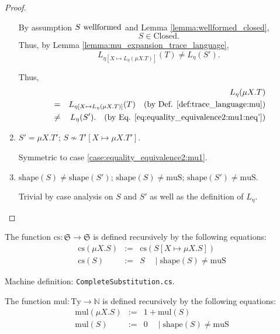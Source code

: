 \documentclass{llncs}
\newcommand*{\Nat}{\mathbb{N}}
\newcommand*{\Ty}{\mathrm{Ty}}
\renewcommand*{\S}{\mathfrak{S}}
\newcommand*{\cs}{\mathrm{cs}}
\newcommand*{\mul}{\mathrm{mul}}
\newcommand*{\shape}{\mathrm{shape}}
\newcommand*{\muS}{\mathrm{muS}}
\newcommand*{\Closed}{\mathrm{Closed}}
\newcommand*{\nsequiv}{\not\sim}
\newcommand*{\wf}[1]{\text{$#1$ {\normalfont \rmfamily wellformed}}}
\renewcommand*{\|}{\;|\;}
\newcommand*{\machdefc}[1]{Machine definition: \code{#1}.}
\newcommand*{\code}[1]{\texttt{#1}}
\begin{document}
\begin{proof}
\begin{enumerate}
      By assumption $\wf{S}$ and Lemma \ref{lemma:wellformed_closed},
      \begin{equation*}
        S \in \Closed.
      \end{equation*}
      Thus, by Lemma \ref{lemma:mu_expansion_trace_language},
      \begin{equation}
        \label{eq:equality_equivalence2:mu1:neq'}
        L_{\eta[X \mapsto L_\eta(\mu X.T)]}(T) \neq L_\eta(S').
      \end{equation}

      Thus,
      \begin{eqnarray*}
        &&     L_\eta(\mu X.T) \\
        &=&    L_{\eta[X \mapsto L_\eta(\mu X.T)]}(T)
               \quad \text{(by Def. \ref{def:trace_language:mu})} \\
        &\neq& L_\eta(S').
               \quad \text{(by Eq. \ref{eq:equality_equivalence2:mu1:neq'})}
      \end{eqnarray*}

    \item
      \label{case:equality_equivalence2:mu2}
      $S' = \mu X.T'$; $S \nsequiv T'[X \mapsto \mu X.T']$.

      Symmetric to case \ref{case:equality_equivalence2:mu1}.

    \item
      \label{case:equality_equivalence2:shape}
      $\shape(S) \neq \shape(S')$; $\shape(S) \neq \muS$; $\shape(S') \neq \muS$.

      Trivial by case analysis on $S$ and $S'$ as well as the definition
      of $L_\eta$.
  \end{enumerate}
\end{proof}


\begin{definition}
  \label{def:cs}
  The function $\cs\colon \S \to \S$ is defined recursively by the following
  equations:
  \begin{eqnarray*}
    \cs(\mu X.S) &:=& \cs(S[X \mapsto \mu X.S]) \\
    \cs(S) &:=& S \quad \mid \shape(S) \neq \muS
  \end{eqnarray*}

  \machdefc{CompleteSubstitution.cs}
\end{definition}


\begin{definition}
  \label{def:mul}
  The function $\mul\colon \Ty \to \Nat$ is defined recursively by the
  following equations:
  \begin{eqnarray*}
    \mul(\mu X.S) &:=& 1 + \mul(S) \\
    \mul(S) &:=& 0 \quad \mid \shape(S) \neq \muS
  \end{eqnarray*}
\end{definition}
\end{document}
